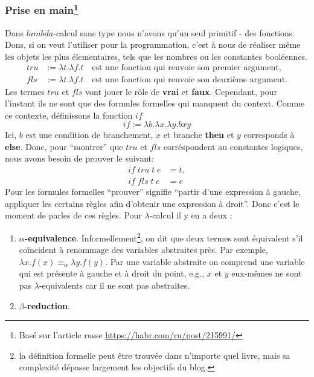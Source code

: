 \documentclass[12pt, a4paper]{article}
\newtheorem*{remark}{Remarque}
\begin{document}
\subsubsection*{Prise en main\footnote{Basé sur l'article russe \url{https://habr.com/ru/post/215991/}}}
Dans $lambda$-calcul sans type nous n'avons qu'un seul primitif - des fonctions.
Dons, si on veut l'utiliser pour la programmation, c'est à nous de réaliser même les objets les plus élementaires, tels que les nombres ou les constantes booléennes.
\begin{eqnarray*}
tru &:= \lambda t.\lambda f.t \quad \text{est une fonction qui renvoie son premier argument,} \\
fls &:= \lambda t.\lambda f.t \quad \text{est une fonction qui renvoie son deuxième argument.}
\end{eqnarray*}
Les termes $tru$ et $fls$ vont jouer le rôle de \textbf{vrai} et \textbf{faux}.
Cependant, pour l'instant ils ne sont que des formules formelles qui manquent du context.
Comme ce contexte, définissons la fonction $if$
$$if := \lambda b.\lambda x.\lambda y.b x y$$
Ici, $b$ est une condition de branchement, $x$ et branche \textbf{then} et $y$ corresponds à \textbf{else}.
Donc, pour ``montrer'' que $tru$ et $fls$ corréspondent au constantes logiques, nous avons besoin de prouver le suivant:
\begin{eqnarray*}
	if \; tru \; t \; e &= t, \\
	if \; fls \; t \; e &= e
\end{eqnarray*}
Pour les formules formelles ``prouver'' signifie ``partir d'une expression à gauche, appliquer les certains règles afin d'obtenir une expression à droit''.
Donc c'est le moment de parles de ces règles.
Pour $\lambda$-calcul il y en a deux :
\begin{enumerate}
	\item \textbf{$\alpha$-equivalence}. Informellement\footnote{la définition formelle peut être trouvée dans n'importe quel livre, mais sa complexité dépasse largement les objectifs du blog.}, on dit que deux termes sont équivalent s'il coïncident à renommage des variables abstraites près. Par exemple, $\lambda x.f(x) \equiv_\alpha \lambda y.f(y)$.
	Par une variable abstraite on comprend une variable qui est présente à gauche et à droit du point, e.g., $x$ et $y$ eux-mêmes ne sont pas $\lambda$-equivalents car il ne sont pas abstraites.
	\item \textbf{$\beta$-reduction}.
\end{enumerate}
\end{document}
